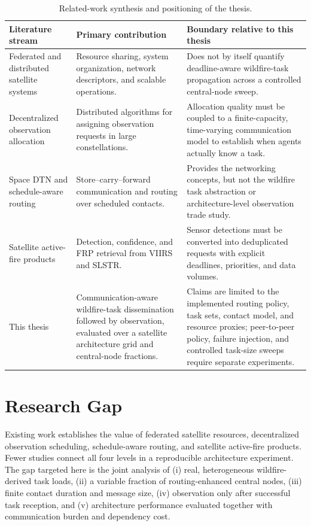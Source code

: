 \begin{table}[H]
\centering
\caption{Related-work synthesis and positioning of the thesis.}
\label{tab:related_work_positioning}
\small
\begin{tabularx}{\textwidth}{p{}p{}Y}
\toprule
Literature stream & Primary contribution & Boundary relative to this thesis \\
\midrule
Federated and distributed satellite systems \citep{Golkar2015,Scrocciolani2024,BenLarbi2021} & Resource sharing, system organization, network descriptors, and scalable operations. & Does not by itself quantify deadline-aware wildfire-task propagation across a controlled central-node sweep. \\
Decentralized observation allocation \citep{Parjan2023,Zilberstein2025} & Distributed algorithms for assigning observation requests in large constellations. & Allocation quality must be coupled to a finite-capacity, time-varying communication model to establish when agents actually know a task. \\
Space DTN and schedule-aware routing \citep{Burleigh2022,Araniti2015,CCSDS2019} & Store--carry--forward communication and routing over scheduled contacts. & Provides the networking concepts, but not the wildfire task abstraction or architecture-level observation trade study. \\
Satellite active-fire products \citep{Schroeder2014,WoosterSLSTR2012,XuWooster2023} & Detection, confidence, and FRP retrieval from VIIRS and SLSTR. & Sensor detections must be converted into deduplicated requests with explicit deadlines, priorities, and data volumes. \\
This thesis & Communication-aware wildfire-task dissemination followed by observation, evaluated over a satellite architecture grid and central-node fractions. & Claims are limited to the implemented routing policy, task sets, contact model, and resource proxies; peer-to-peer policy, failure injection, and controlled task-size sweeps require separate experiments. \\
\bottomrule
\end{tabularx}
\end{table}

\section{Research Gap}

Existing work establishes the value of federated satellite resources, decentralized observation scheduling, schedule-aware routing, and satellite active-fire products. Fewer studies connect all four levels in a reproducible architecture experiment. The gap targeted here is the joint analysis of (i) real, heterogeneous wildfire-derived task loads, (ii) a variable fraction of routing-enhanced central nodes, (iii) finite contact duration and message size, (iv) observation only after successful task reception, and (v) architecture performance evaluated together with communication burden and dependency cost.

